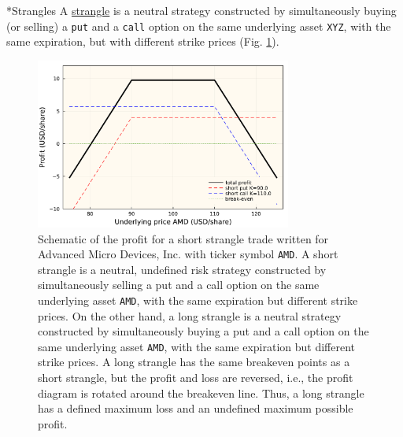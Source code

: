 \documentclass[11pt]{article}
\makeatletter
\theoremstyle{definition}
\renewcommand\subsubsection{\@startsection
	{subsubsection}{2}{0mm}
	{-0.05in}
	{-0.5\baselineskip}
	{\normalfont\normalsize\itshape\bfseries}}
\makeatother
\begin{document}
\subsubsection*{Strangles}
A \href{https://www.investopedia.com/terms/s/strangle.asp}{strangle} is a neutral strategy constructed by simultaneously buying (or selling)
a \texttt{put} and a \texttt{call} option on the same underlying asset \texttt{XYZ}, with the same expiration, but with different strike prices (Fig. \ref{fig:options-short-strangle-profit}).

\begin{figure}[h]
    \centering
    \includegraphics[width=0.75\textwidth]{./figs/Fig-AMD-Profit-Short-Strangle.pdf}
    \caption{Schematic of the profit for a short strangle trade written for Advanced Micro Devices, Inc. with ticker symbol \texttt{AMD}.
	A short strangle is a neutral, undefined risk strategy constructed by simultaneously selling a put and a call option on the same underlying asset \texttt{AMD}, with the same expiration but different strike prices.
	On the other hand, a long strangle is a neutral strategy constructed by simultaneously buying a put and a call option on the same underlying asset \texttt{AMD}, with the same expiration but different strike prices.
	A long strangle has the same breakeven points as a short strangle, but the profit and loss are reversed, i.e., the profit diagram is rotated around the breakeven line.
	Thus, a long strangle has a defined maximum loss and an undefined maximum possible profit.
	}\label{fig:options-short-strangle-profit}
\end{figure}
\end{document}
